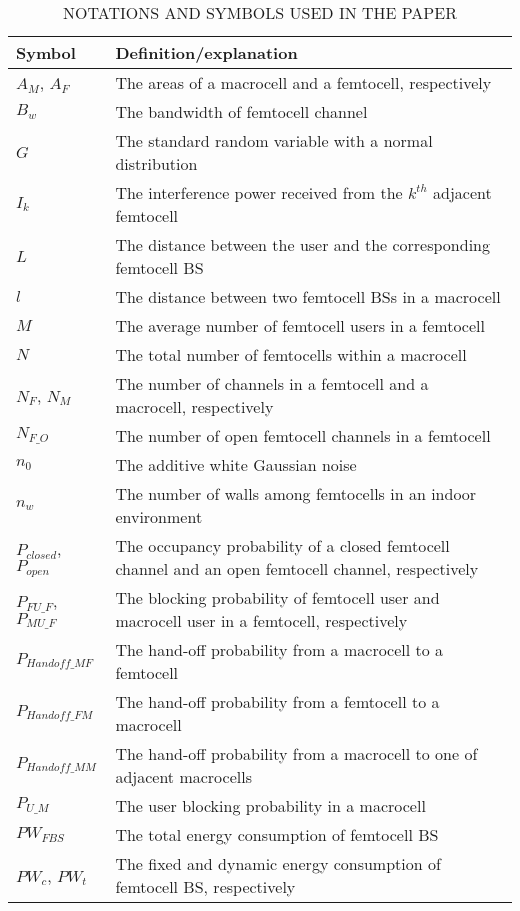 \documentclass[10pt,final,journal,letterpaper,twoside,twocolumn]{IEEEtran}
\begin{document}
\begin{table*}[htbp]
\centering
\caption{NOTATIONS AND SYMBOLS USED IN THE PAPER}
\begin{tabular}{l|l}
\hline Symbol & Definition/explanation \\
\hline
${A_M}$, ${A_F}$ & The areas of a macrocell and a femtocell, respectively \\
${B_w}$ & The bandwidth of femtocell channel \\
$G$ & The standard random variable with a normal distribution \\
${I_k}$ & The interference power received from the ${k^{th}}$ adjacent femtocell \\
${L}$ & The distance between the user and the corresponding femtocell BS \\
$l$ & The distance between two femtocell BSs in a macrocell \\
${M}$ & The average number of femtocell users in a femtocell \\
${N}$ & The total number of femtocells within a macrocell \\
${N_F}$, ${N_M}$ & The number of channels in a femtocell and a macrocell, respectively \\
${N_{F\_O}}$ & The number of open femtocell channels in a femtocell \\
${n_0}$ & The additive white Gaussian noise \\
${n_w}$ & The number of walls among femtocells in an indoor environment \\
${P_{closed}}$, ${P_{open}}$ & The occupancy probability of a closed femtocell channel and an open femtocell channel, respectively \\
${P_{FU\_F}}$, ${P_{MU\_F}}$ & The blocking probability of femtocell user and macrocell user in a femtocell, respectively\\
${P_{Handoff\_MF}}$ & The hand-off probability from a macrocell to a femtocell \\
${P_{Handoff\_FM}}$ & The hand-off probability from a femtocell to a macrocell \\
${P_{Handoff\_MM}}$ & The hand-off probability from a macrocell to one of adjacent macrocells \\
${P_{U\_M}}$ & The user blocking probability in a macrocell\\
${PW_{FBS}}$ & The total energy consumption of femtocell BS \\
${PW_c}$, ${PW_t}$ & The fixed and dynamic energy consumption of femtocell BS, respectively \\

\end{tabular}
\end{table*}
\end{document}
